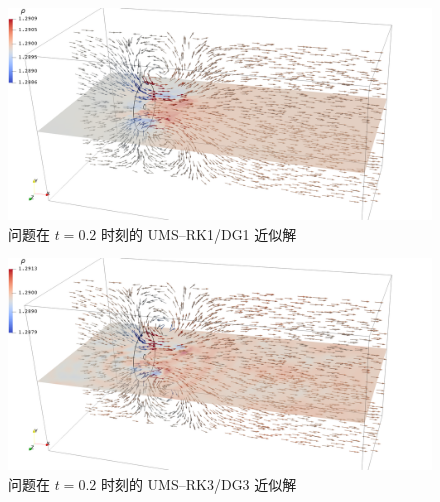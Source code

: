 \begin{figure}[h!]
\begin{centering}
\includegraphics[width=1\textwidth,height=0.26\textheight,keepaspectratio]{figures/upward/p=1/Frame20}
\par\end{centering}
\caption{\label{fig:upward_t=00003D2e-1_p=00003D1}问题在
$t=0.2$ 时刻的 UMS–RK1/DG1 近似解}
\end{figure}

\begin{figure}[h!]
\begin{centering}
\includegraphics[width=1\textwidth,height=0.26\textheight,keepaspectratio]{figures/upward/p=3/Frame20}
\par\end{centering}
\caption{\label{fig:upward_t=00003D2e-1_p=00003D3}问题在
$t=0.2$ 时刻的 UMS–RK3/DG3 近似解}
\end{figure}

